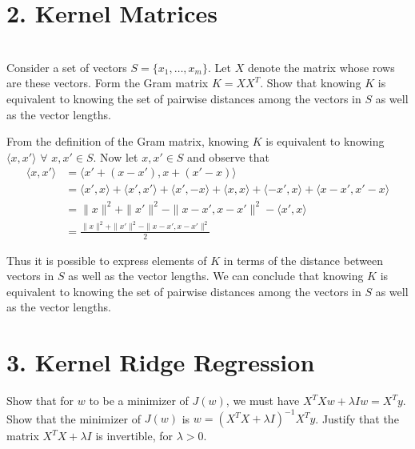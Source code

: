 \documentclass[12pt,letterpaper]{article}
\begin{document}
\newenvironment{solution}[2][Solution]{\begin{trivlist}
\item[\hskip \labelsep {\bfseries #1}]}{\end{trivlist}}
\newenvironment{problem}[2][Problem]{\begin{trivlist}
\item[\hskip \labelsep {\bfseries #1}\hskip \labelsep {\bfseries #2.}]}{\end{trivlist}}


\section*{2. Kernel Matrices}

\begin{problem}{2.1}
\\
Consider a set of vectors $S=\{x_{1},\ldots,x_{m}\}$.
Let $X$ denote the matrix whose rows are these vectors. Form the
Gram matrix $K=XX^{T}$. Show that knowing $K$ is equivalent to knowing
the set of pairwise distances among the vectors in $S$ as well as
the vector lengths.
\end{problem}



\begin{solution}{}
From the definition of the Gram matrix, knowing $K$ is equivalent to knowing
$\langle x, x' \rangle\,\, \forall\,\, x,x' \in S$. Now let $x,x' \in S$ and observe that
\begin{align*}
    \langle x,x' \rangle &= \langle x'+(x-x'), x+(x'-x) \rangle\\
    &= \langle x', x\rangle + \langle x', x'\rangle + \langle x', -x\rangle + \langle x, x\rangle + \langle -x', x\rangle + \langle x - x', x'-x\rangle\\
    &= \|x\|^2 + \|x'\|^2 - \|x-x', x-x'\|^2 - \langle x',x \rangle\\
    &= \frac{\|x\|^2 + \|x'\|^2 - \|x-x', x-x'\|^2}{2}
\end{align*}

Thus it is possible to express elements of $K$ in terms of the distance between vectors in $S$ as well as the vector lengths. We can conclude that
knowing $K$ is equivalent to knowing the set of pairwise distances among the vectors in $S$ as well as the vector lengths.
\end{solution}
\newpage


\section*{3. Kernel Ridge Regression}
\begin{problem}{3.1}
Show that for $w$ to be a minimizer of $J(w)$, we must have $X^{T}Xw+\lambda Iw=X^{T}y$.
Show that the minimizer of $J(w)$ is $w=(X^{T}X+\lambda I)^{-1}X^{T}y$.
Justify that the matrix $X^{T}X+\lambda I$ is invertible, for $\lambda>0$.
\end{problem}
\end{document}
